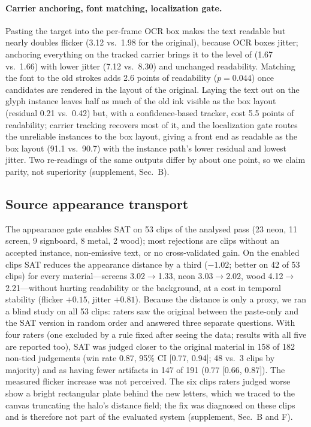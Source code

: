 \paragraph{Carrier anchoring, font matching, localization gate.} Pasting the target into the per-frame OCR box makes the text readable but nearly doubles flicker (3.12 vs.\ 1.98 for the original), because OCR boxes jitter; anchoring everything on the tracked carrier brings it to the level of \steer (1.67 vs.\ 1.66) with lower jitter (7.12 vs.\ 8.30) and unchanged readability. Matching the font to the old strokes adds 2.6 points of readability ($p=0.044$) once candidates are rendered in the layout of the original. Laying the text out on the glyph instance leaves half as much of the old ink visible as the box layout (residual 0.21 vs.\ 0.42) but, with a confidence-based tracker, cost 5.5 points of readability; carrier tracking recovers most of it, and the localization gate routes the unreliable instances to the box layout, giving a front end as readable as the box layout (91.1 vs.\ 90.7) with the instance path's lower residual and lowest jitter. Two re-readings of the same outputs differ by about one point, so we claim parity, not superiority (supplement, Sec.~B).

\subsection{Source appearance transport}
\label{sec:exp_sat}
The appearance gate enables SAT on 53 clips of the analysed pass (23 neon, 11 screen, 9 signboard, 8 metal, 2 wood); most rejections are clips without an accepted instance, non-emissive text, or no cross-validated gain. On the enabled clips SAT reduces the appearance distance by a third ($-1.02$; better on 42 of 53 clips) for every material---screens 3.02$\to$1.33, neon 3.03$\to$2.02, wood 4.12$\to$2.21---without hurting readability or the background, at a cost in temporal stability (flicker $+0.15$, jitter $+0.81$). Because the distance is only a proxy, we ran a blind study on all 53 clips: raters saw the original between the paste-only and the SAT version in random order and answered three separate questions. With four raters (one excluded by a rule fixed after seeing the data; results with all five are reported too), SAT was judged closer to the original material in 158 of 182 non-tied judgements (win rate 0.87, 95\% CI [0.77, 0.94]; 48 vs.\ 3 clips by majority) and as having fewer artifacts in 147 of 191 (0.77 [0.66, 0.87]). The measured flicker increase was not perceived. The six clips raters judged worse show a bright rectangular plate behind the new letters, which we traced to the canvas truncating the halo's distance field; the fix was diagnosed on these clips and is therefore not part of the evaluated system (supplement, Sec.~B and F).

